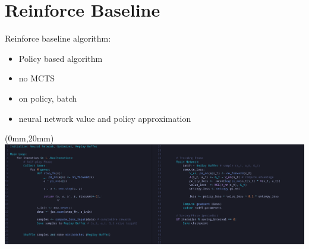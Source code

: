 \documentclass[aspectratio=169,xcolor=dvipsnames]{beamer}
\begin{document}
\section{Reinforce Baseline}

\begin{frame}{}
    Reinforce baseline algorithm:

    \medskip
    \begin{itemize}
    \item Policy based algorithm
    \item no MCTS
    \item on policy, batch
    \item neural network value and policy approximation
\end{itemize}
\end{frame}

\begin{frame}{}
    \begin{textblock*}{\paperwidth}(0mm,20mm) %
        \includegraphics[width=\paperwidth,height=\paperheight,keepaspectratio]{reinforce_algo.png}
    \end{textblock*}
\end{frame}
\end{document}
